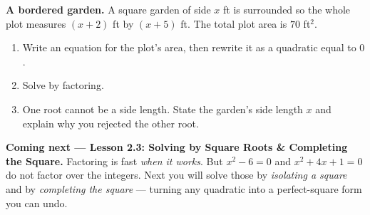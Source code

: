 \documentclass[10pt]{article}
\begin{document}
\begin{extensionbox}
\textbf{A bordered garden.} A square garden of side $x$ ft is surrounded so the whole plot measures
$(x+2)$ ft by $(x+5)$ ft. The total plot area is $70$ ft$^2$.
\begin{enumerate}[label=(\alph*), leftmargin=1.8em, itemsep=5pt]
  \item Write an equation for the plot's area, then rewrite it as a quadratic equal to $0$.
  \item Solve by factoring.
  \item One root cannot be a side length. State the garden's side length $x$ and explain why you rejected
        the other root.
\end{enumerate}
\end{extensionbox}

\begin{spiralbox}
\textbf{Coming next --- Lesson 2.3: Solving by Square Roots \& Completing the Square.} Factoring is fast
\emph{when it works}. But $x^2-6=0$ and $x^2+4x+1=0$ do not factor over the integers. Next you will solve
those by \emph{isolating a square} and by \emph{completing the square} --- turning any quadratic into a
perfect-square form you can undo.
\end{spiralbox}
\end{document}
